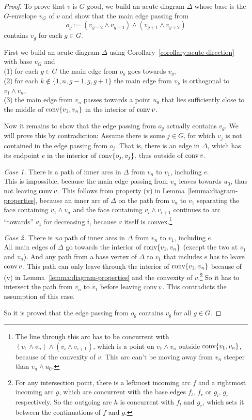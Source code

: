\begin{proof}
  To prove that $v$ is $G$-good, we build an acute diagram $\Delta$ whose base is the $G$-envelope $v_G$ of $v$ and show that the main edge passing from $$o_g := (v_{g-2} \wedge v_{g-1}) \wedge (v_{g+1} \wedge v_{g+2})$$ contains $v_g$ for each $g \in G$.

  First we build an acute diagram $\Delta$ using Corollary~\ref{corollary:acute-direction} with base $v_G$ and\\
  (1) for each $g \in G$ the main edge from $o_g$ goes towards $v_g$,\\
  (2) for each $k \notin \{1,n,g-1,g,g+1\}$ the main edge from $v_k$ is orthogonal to $v_1 \wedge v_n$,\\
  (3) the main edge from $v_n$ passes towards a point $u_0$ that lies sufficiently close to the middle of $\operatorname{conv} \{v_1,v_n\}$ in the interior of $\operatorname{conv} v$.

  Now it remains to show that the edge passing from $o_g$ actually contains $v_g$. We will prove this by contradiction: Assume there is some $j \in G$, for which $v_j$ is not contained in the edge passing from $o_j$. That is, there is an edge in $\Delta$, which has its endpoint $e$ in the interior of $\operatorname{conv} \{o_j, v_j\}$, thus outside of $\operatorname{conv} v$.

  \textit{Case 1.} There is a path of inner arcs in $\Delta$ from $v_n$ to $v_1$, including $e$.\\
  This is impossible, because the main edge passing from $v_n$ leaves towards $u_0$, thus not leaving $\operatorname{conv} v$. This follows from property (v) in Lemma~\ref{lemma:diagram-properties}, because an inner arc of $\Delta$ on the path from $v_n$ to $v_1$ separating the face containing $v_1 \wedge v_n$ and the face containing $v_i \wedge v_{i+1}$ continues to arc ``towards'' $v_1$ for decreasing $i$, because $v$ itself is convex.\footnote{The line through this arc has to be concurrent with $(v_1 \wedge v_n) \wedge (v_i \wedge v_{i+1})$, which is a point on $v_1 \wedge v_n$ outside $\operatorname{conv} \{v_1,v_n\}$, because of the convexity of $v$. This arc can't be moving away from $v_n$ steeper than $v_n \wedge u_0$.}

  \textit{Case 2.} There is \emph{no} path of inner arcs in $\Delta$ from $v_n$ to $v_1$, including $e$.\\
  All main edges of $\Delta$ go towards the interior of $\operatorname{conv} \{v_1, v_n\}$ (except the two at $v_1$ and $v_n$). And any path from a base vertex of $\Delta$ to $v_1$ that includes $e$ has to leave $\operatorname{conv} v$. This path can only leave through the interior of $\operatorname{conv}\{v_1,v_n\}$ because of (v) in Lemma~\ref{lemma:diagram-properties} and the convexity of $v$.\footnote{For any intersection point, there is a leftmost incoming arc $f$ and a rightmost incoming arc $g$, which are concurrent with the base edges $f_l$, $f_r$ or $g_l$, $g_r$ respectively. So the outgoing arc $h$ is concurrent with $f_l$ and $g_r$, which sets it between the continuations of $f$ and $g$.}
  So it has to intersect the path from $v_n$ to $v_1$ before leaving $\operatorname{conv} v$. This contradicts the assumption of this case.

  So it is proved that the edge passing from $o_g$ contains $v_g$ for all $g \in G$.
\end{proof}

